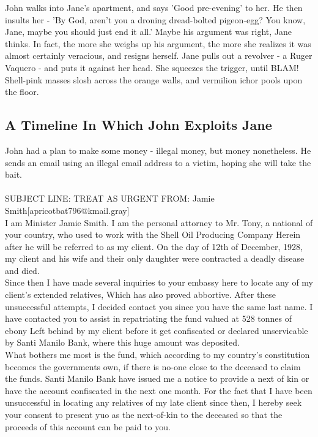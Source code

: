 \documentclass{article}
\begin{document}
John walks into Jane's apartment, and says 'Good pre{-}evening' to her.
He then insults her {-} 'By God, aren't you a droning dread{-}bolted pigeon{-}egg?
You know, Jane, maybe you should just end it all.'
Maybe his argument was right, Jane thinks.
In fact, the more she weighs up his argument, the more she realizes it was almost certainly veracious, and resigns herself.
Jane pulls out a revolver {-} a Ruger Vaquero {-} and puts it against her head.
She squeezes the trigger, until BLAM!
Shell{-}pink masses slosh across the orange walls, and vermilion ichor pools upon the floor.
\subsection{A Timeline In Which John Exploits Jane}


John had a plan to make some money {-} illegal money, but money nonetheless.
He sends an email using an illegal email address to a victim, hoping she will take the bait.
\\\\
SUBJECT LINE: TREAT AS URGENT
FROM: Jamie Smith[apricotbat796@kmail.gray]
\\
I am Minister Jamie Smith.
I am the personal attorney to Mr. Tony, a national of your country, who used to work with the Shell Oil Producing Company
Herein after he will be referred to as my client.
On the day of 12th of December, 1928, my client and his wife and their only daughter were contracted a deadly disease and died.
\\
Since then I have made several inquiries to your embassy here to locate any of my client's extended relatives, Which has also proved abbortive.
After these unsuccessful attempts, I decided contact you since you have the same last name.
I have contacted you to assist in repatriating the fund valued at 528 tonnes of ebony Left behind by my client before it get confiscated or declared unservicable by Santi Manilo Bank, where this huge amount was deposited.
\\
What bothers me most is the fund, which according to my country's constitution becomes the governments own, if there is no{-}one close to the deceased to claim the funds.
Santi Manilo Bank have issued me a notice to provide a next of kin or have the account confiscated in the next one month.
For the fact that I have been unsuccessful in locating any relatives of my late client since then, I hereby seek your consent to present yuo as the next{-}of{-}kin to the deceased so that the proceeds of this account can be paid to you.
\end{document}
